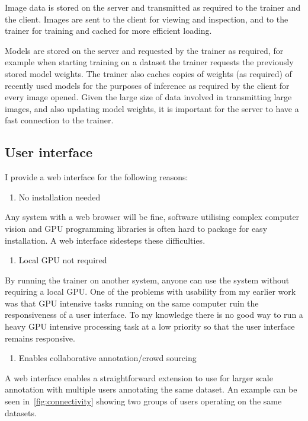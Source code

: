 Image data is stored on the server and transmitted as required to the trainer and the client. Images are sent to the client for viewing and inspection, and to the trainer for training and cached for more efficient loading. 

Models are stored on the server and requested by the trainer as required, for example when starting training on a dataset the trainer requests the previously stored model weights. The trainer also caches copies of weights (as required) of recently used models for the purposes of inference as required by the client for every image opened. Given the large size of data involved in transmitting large images, and also updating model weights, it is important for the server to have a fast connection to the trainer.

\subsection {User interface}

I provide a web interface for the following reasons:

\begin{enumerate}
    \item No installation needed
\end{enumerate}
Any system with a web browser will be fine, software utilising complex computer vision and GPU programming libraries is often hard to package for easy installation. A web interface sidesteps these difficulties.
\begin{enumerate}[resume]
    \item Local GPU not required
\end{enumerate}
By running the trainer on another system, anyone can use the system without requiring a local GPU. One of the problems with usability from my earlier work was that GPU intensive tasks running on the same computer ruin the responsiveness of a user interface. To my knowledge there is no good way to run a heavy \gls{GPU} intensive processing task at a low priority so that the user interface remains responsive.
\begin{enumerate}[resume]
    \item Enables collaborative annotation/crowd sourcing
\end{enumerate}
A web interface enables a straightforward extension to use for larger scale annotation with multiple users annotating the same dataset. An example can be seen in~\ref{fig:connectivity} showing two groups of users operating on the same datasets.


